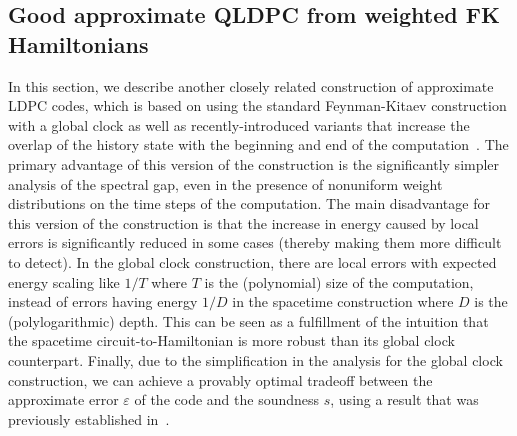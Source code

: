 \documentclass[11pt,letterpaper]{article}
\theoremstyle{definition}
\theoremstyle{remark}
\numberwithin{equation}{section}
\theoremstyle{definition}
\begin{document}
\subsection{Good approximate QLDPC from weighted FK Hamiltonians}
\label{sec:globalFK}
In this section, we describe another closely related construction of approximate LDPC codes, which is based on using the standard Feynman-Kitaev construction with a global clock as well as recently-introduced variants that increase the overlap of the history state with the beginning and end of the computation~\cite{Bausch2018analysislimitations,caha2018clocks}.  The primary advantage of this version of the construction is the significantly simpler analysis of the spectral gap, even in the presence of nonuniform weight distributions on the time steps of the computation.  The main disadvantage for this version of the construction is that the increase in energy caused by local errors is significantly reduced in some cases (thereby making them more difficult to detect).  In the global clock construction, there are local errors with expected energy scaling like $1/T$ where $T$ is the (polynomial) size of the computation, instead of errors having energy $1/D$ in the spacetime construction where $D$ is the (polylogarithmic) depth.  This can be seen as a fulfillment of the intuition that the spacetime circuit-to-Hamiltonian is more robust than its global clock counterpart.  Finally, due to the simplification in the analysis for the global clock construction, we can achieve a provably optimal tradeoff between the approximate error $\varepsilon$ of the code and the soundness $s$, using a result that was previously established in~\cite{Bausch2018analysislimitations}.  
\end{document}

